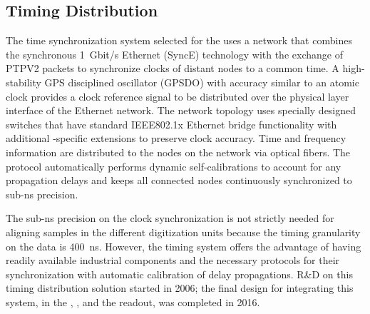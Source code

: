 \subsection{Timing Distribution}
\label{ssec:dp-tpcelec-wr}
The time synchronization system selected for the  uses a  network  that combines the synchronous \SI{1}{Gbit/s} Ethernet (SyncE) technology with the exchange of PTPV2 packets  to synchronize clocks of distant nodes to a common time. A high-stability GPS disciplined oscillator (GPSDO) with  accuracy similar to an atomic clock provides a clock reference signal to be distributed over the physical layer interface of the  Ethernet network. The network topology uses specially designed switches that have standard IEEE802.1x Ethernet bridge functionality with additional -specific extensions to preserve clock accuracy. Time and frequency information are distributed to the nodes on the  network via optical fibers. The  protocol automatically performs dynamic self-calibrations to account for any propagation delays and keeps all connected nodes continuously synchronized to sub-\si{\nano\second} precision. 

The  sub-\si{\nano\second} precision on the clock synchronization is not strictly needed for aligning samples in the different  digitization units because the timing granularity on the data is \SI{400}{ns}. However, the  timing system offers the advantage of having readily available industrial components and the necessary protocols for their synchronization with automatic calibration of delay propagations. R\&D on this timing distribution solution started in 2006; the final design for integrating this system, in the , , and the  readout, was completed in 2016. 

